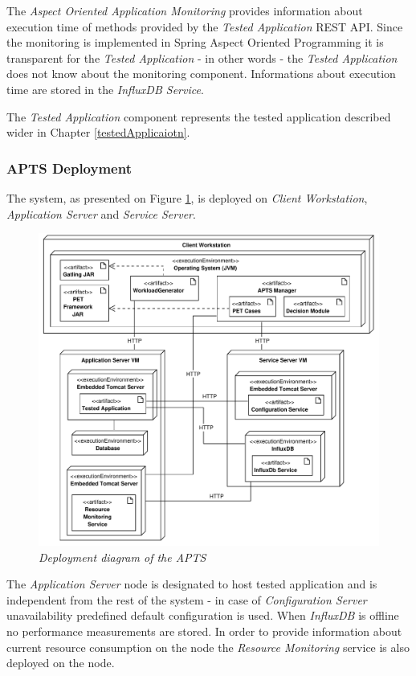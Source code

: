 \documentclass[10pt,a4paper]{article}
\begin{document}
The \textit{Aspect Oriented Application Monitoring} provides information about execution time of methods provided by the \textit{Tested Application} REST API. Since the monitoring is implemented in Spring Aspect Oriented Programming \cite{springaop} it is transparent for the \textit{Tested Application} - in other words - the \textit{Tested Application} does not know about the monitoring component. Informations about execution time are stored in the \textit{InfluxDB Service}.

The \textit{Tested Application} component represents the tested application described      wider in Chapter \ref{testedApplicaiotn}.


\subsubsection{APTS Deployment}

The system, as presented on Figure \ref{deploymentapts}, is deployed on \textit{Client Workstation}, \textit{Application Server} and \textit{Service Server}.

\begin{figure}[!htb]
\centering
\includegraphics[width=1\textwidth]{APTSDeploymentDiagram}
\caption{\textit{Deployment diagram of the APTS}}
\label{deploymentapts}
\end{figure}



The \textit{Application Server} node is designated to host tested application and is independent from the rest of the system - in case of \textit{Configuration Server} unavailability predefined default configuration is used. When \textit{InfluxDB} is offline no performance measurements are stored. In order to provide information about current resource consumption on the node the \textit{Resource Monitoring} service is also deployed on the node. 
\end{document}
